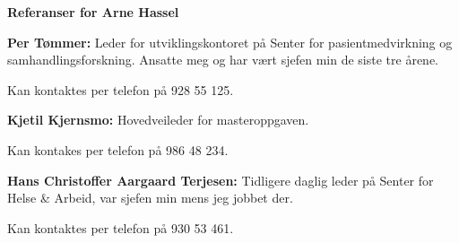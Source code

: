 \documentclass[letterpaper,11pt,norsk]{article}
\begin{document}
\textbf{\Large Referanser for Arne Hassel}

\textbf{Per Tømmer:} Leder for utviklingskontoret på Senter for pasientmedvirkning og samhandlingsforskning. Ansatte meg og har vært sjefen min de siste tre årene.

Kan kontaktes per telefon på 928 55 125.

\textbf{Kjetil Kjernsmo:} Hovedveileder for masteroppgaven.

Kan kontakes per telefon på 986 48 234.

\textbf{Hans Christoffer Aargaard Terjesen:} Tidligere daglig leder på Senter for Helse \& Arbeid, var sjefen min mens jeg jobbet der.

Kan kontaktes per telefon på 930 53 461.
\end{document}
